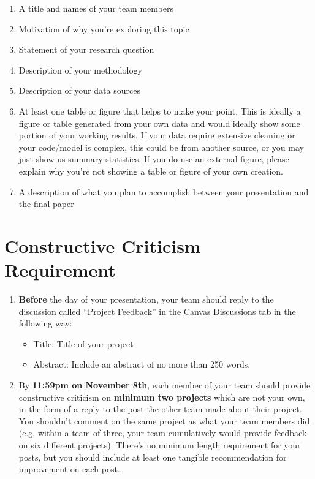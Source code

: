 \begin{enumerate}
    \item A title and names of your team members
    \item Motivation of why you're exploring this topic
    \item Statement of your research question 
    \item Description of your methodology
    \item Description of your data sources
    \item At least one table or figure that helps to make your point. This is ideally a figure or table generated from your own data and would ideally show some portion of your working results. If your data require extensive cleaning or your code/model is complex, this could be from another source, or you may just show us summary statistics. If you do use an external figure, please explain why you're not showing a table or figure of your own creation.
    \item A description of what you plan to accomplish between your presentation and the final paper
\end{enumerate}

\section{Constructive Criticism Requirement}

\begin{enumerate}
    \item \textbf{Before} the day of your presentation, your team should reply to the discussion called ``Project Feedback'' in the Canvas Discussions tab in the following way:
    \begin{itemize}
        \item Title: Title of your project
        \item Abstract: Include an abstract of no more than 250 words.
    \end{itemize}
    \item By \textbf{11:59pm on November 8th}, each member of your team should provide constructive criticism on \textbf{minimum two projects} which are not your own, in the form of a reply to the post the other team made about their project. You shouldn't comment on the same project as what your team members did (e.g. within a team of three, your team cumulatively would provide feedback on six different projects). There's no minimum length requirement for your posts, but you should include at least one tangible recommendation for improvement on each post.
\end{enumerate}

